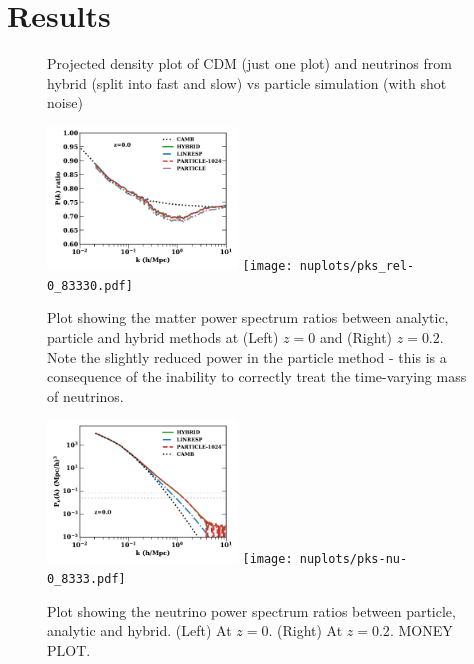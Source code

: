\documentclass[useAMS, usenatbib]{mnras}
\begin{document}

%



\section{Results}
\label{sec:results}

\begin{figure}
  \caption{Projected density plot of CDM (just one plot) and neutrinos from hybrid (split into fast and slow) vs particle simulation (with shot noise)}
  \label{fig:density_plot}
\end{figure}

\begin{figure}
\includegraphics[width=0.45\textwidth]{nuplots/pks_rel-10.pdf}
\texttt{[image: nuplots/pks\_rel-0\_83330.pdf]}
  \caption{Plot showing the matter power spectrum ratios between analytic, particle and hybrid methods at (Left) $z=0$ and (Right) $z=0.2$. Note the slightly reduced power in the particle method - this is a consequence of the inability to correctly treat the time-varying mass of neutrinos.
  }
  \label{fig:matter_power}
\end{figure}

\begin{figure}
\includegraphics[width=0.45\textwidth]{nuplots/pks-nu-1.pdf}
\texttt{[image: nuplots/pks-nu-0\_8333.pdf]}
  \caption{Plot showing the neutrino power spectrum ratios between particle, analytic and hybrid.
  (Left) At $z=0$. (Right) At $z=0.2$.
  MONEY PLOT.}
  \label{fig:neutrino_power}
\end{figure}
\end{document}
